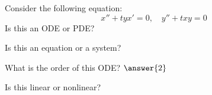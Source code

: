 \documentclass{ximera}
\begin{document}
\begin{exercise}
    Consider the following equation:  
    \[
        x''+tyx'=0, \quad y''+txy = 0
    \]
    Is this an ODE or PDE?
    \begin{multipleChoice}
    \end{multipleChoice}
    \begin{problem}
        Is this an equation or a system?
        \begin{multipleChoice}
        \end{multipleChoice}
        
        \begin{problem}
            What is the order of this ODE? $\answer{2}$
            
            \begin{problem}
                Is this linear or nonlinear?
                \begin{multipleChoice}
                \end{multipleChoice}
%                
%                    
            \end{problem}
        \end{problem}
    \end{problem}
\end{exercise}
\end{document}
